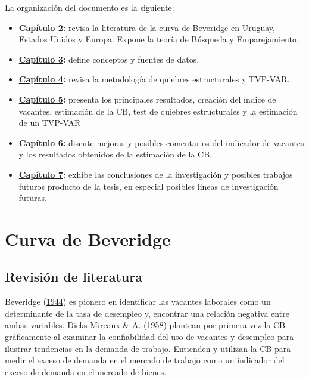 \documentclass[12pt,oneside]{reedthesis}
\begin{document}
La organización del documento es la siguiente:
\begin{itemize}
\item
  \textbf{\protect\hyperlink{cap:Fundamentos}{Capítulo 2}:} revisa la literatura de la curva de Beveridge en Uruguay, Estados Unidos y Europa. Expone la teoría de Búsqueda y Emparejamiento.
\item
  \textbf{\protect\hyperlink{cap:Datos}{Capítulo 3}:} define conceptos y fuentes de datos.
\item
  \textbf{\protect\hyperlink{cap:Metodologuxeda}{Capítulo 4}:} revisa la metodología de quiebres estructurales y TVP-VAR.
\item
  \textbf{\protect\hyperlink{cap:Resultados}{Capítulo 5}:} presenta los principales resultados, creación del índice de vacantes, estimación de la CB, test de quiebres estructurales y la estimación de un TVP-VAR
\item
  \textbf{\protect\hyperlink{cap:Discusion}{Capítulo 6}:} discute mejoras y posibles comentarios del indicador de vacantes y los resultados obtenidos de la estimación de la CB.
\item
  \textbf{\protect\hyperlink{cap:Conclusiones}{Capítulo 7}:} exhibe las conclusiones de la investigación y posibles trabajos futuros producto de la tesis, en especial posibles lineas de investigación futuras.
\end{itemize}
\hypertarget{cap:Fundamentos}{%
\chapter{Curva de Beveridge}\label{cap:Fundamentos}}

\hypertarget{revisiuxf3n-de-literatura}{%
\section{Revisión de literatura}\label{revisiuxf3n-de-literatura}}

Beveridge (\protect\hyperlink{ref-Beveridge}{1944}) es pionero en identificar las vacantes laborales como un determinante de la tasa de desempleo y, encontrar una relación negativa entre ambas variables. Dicks-Mireaux \& A. (\protect\hyperlink{ref-Dicks-Mireaux1958}{1958}) plantean por primera vez la CB gráficamente al examinar la confiabilidad del uso de vacantes y desempleo para ilustrar tendencias en la demanda de trabajo. Entienden y utilizan la CB para medir el exceso de demanda en el mercado de trabajo como un indicador del exceso de demanda en el mercado de bienes.
\end{document}

